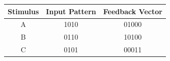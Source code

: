 \documentclass[preview,border=4pt]{standalone}
\begin{document}
\begin{tabular}{ccc}
\toprule
Stimulus & Input Pattern & Feedback Vector \\
\midrule
A & 1010 & 01000 \\
B & 0110 & 10100 \\
C & 0101 & 00011 \\
\bottomrule
\end{tabular}
\end{document}
